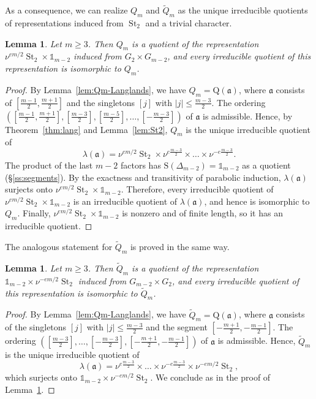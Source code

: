 \documentclass[11pt]{amsart}
\numberwithin{equation}{section}
\theoremstyle{plain}
\newtheorem{lemma}[theorem]{Lemma}
\theoremstyle{definition}
\theoremstyle{remark}
\newcommand{\one}{\mathds{1}}
\DeclareMathOperator{\St}{St}
\newcommand{\Qt}{\widetilde{Q}}
\newcommand{\aaa}{\mathfrak{a}}
\newcommand{\Ss}{\mathrm{S}}
\newcommand{\Qq}{\mathrm{Q}}
\begin{document}
As a consequence, we can realize $Q_m$ and $\Qt_m$ as the unique irreducible quotients of representations induced from $\St_2$ and a trivial character.

\begin{lemma}\label{lem:Qm-quotient}
	Let $m\ge3$. Then $Q_m$ is a quotient of the representation $\nu^{em/2}\St_2\times\one_{m-2}$ induced from $G_2\times G_{m-2}$, and every irreducible quotient of this representation is isomorphic to $Q_m$.
\end{lemma}

\begin{proof}
	By Lemma~\ref{lem:Qm-Langlands}, we have $Q_m=\Qq(\aaa)$, where $\aaa$ consists of $[\frac{m-1}2,\frac{m+1}2]$ and the singletons $[j]$ with $|j|\le\frac{m-3}2$. The ordering $([\frac{m-1}2,\frac{m+1}2],[\frac{m-3}2],[\frac{m-5}2],\dots,[-\frac{m-3}2])$ of $\aaa$ is admissible. Hence, by Theorem~\ref{thm:lang} and Lemma~\ref{lem:St2}, $Q_m$ is the unique irreducible quotient of
	$$
	\lambda(\aaa)=\nu^{em/2}\St_2\times\nu^{e\frac{m-3}2}\times\dots\times\nu^{-e\frac{m-3}2}.
	$$
	The product of the last $m-2$ factors has $\Ss(\Delta_{m-2})=\one_{m-2}$ as a quotient (\S\ref{ss:segments}). By the exactness and transitivity of parabolic induction, $\lambda(\aaa)$ surjects onto $\nu^{em/2}\St_2\times\one_{m-2}$. Therefore, every irreducible quotient of $\nu^{em/2}\St_2\times\one_{m-2}$ is an irreducible quotient of $\lambda(\aaa)$, and hence is isomorphic to $Q_m$. Finally, $\nu^{em/2}\St_2\times\one_{m-2}$ is nonzero and of finite length, so it has an irreducible quotient.
\end{proof}

The analogous statement for $\Qt_m$ is proved in the same way.

\begin{lemma}\label{lem:Qtm-quotient}
	Let $m\ge3$. Then $\Qt_m$ is a quotient of the representation $\one_{m-2}\times\nu^{-em/2}\St_2$ induced from $G_{m-2}\times G_2$, and every irreducible quotient of this representation is isomorphic to $\Qt_m$.
\end{lemma}

\begin{proof}
	By Lemma~\ref{lem:Qm-Langlands}, we have $\Qt_m=\Qq(\aaa)$, where $\aaa$ consists of the singletons $[j]$ with $|j|\le\frac{m-3}2$ and the segment $[-\frac{m+1}2,-\frac{m-1}2]$. The ordering $([\frac{m-3}2],\dots,[-\frac{m-3}2],[-\frac{m+1}2,-\frac{m-1}2])$ of $\aaa$ is admissible. Hence, $\Qt_m$ is the unique irreducible quotient of
	$$
	\lambda(\aaa)=\nu^{e\frac{m-3}2}\times\dots\times\nu^{-e\frac{m-3}2}\times\nu^{-em/2}\St_2,
	$$
	which surjects onto $\one_{m-2}\times\nu^{-em/2}\St_2$. We conclude as in the proof of Lemma~\ref{lem:Qm-quotient}.
\end{proof}
\end{document}
